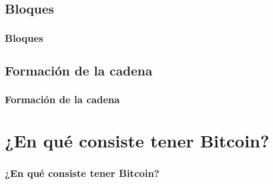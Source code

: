 \documentclass{beamer}
\theoremstyle{definition}
\begin{document}
\subsection{Bloques}
\begin{frame}
	\frametitle{Bloques}
\end{frame}
\subsection{Formación de la cadena}
\begin{frame}
	\frametitle{Formación de la cadena}
\end{frame}


\section{¿En qué consiste tener Bitcoin?}
\begin{frame}
	\frametitle{¿En qué consiste tener Bitcoin?}
\end{frame}
\end{document}
